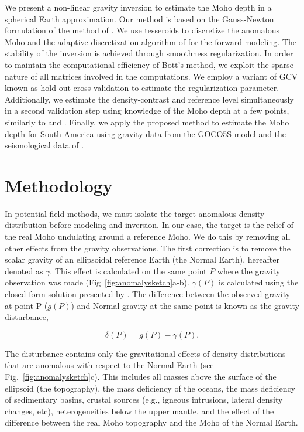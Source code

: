 \documentclass[extra,mreferee]{gji}
\begin{document}
We present a non-linear gravity inversion to estimate the Moho depth in
a spherical Earth approximation.
Our method is based on the \citet{silva2014} Gauss-Newton formulation of the
method of \citet{bott1960}.
We use tesseroids to discretize the anomalous Moho and the adaptive
discretization algorithm of \citet{uieda2016} for the forward modeling.
The stability of the inversion is achieved through smoothness regularization.
In order to maintain the computational efficiency of Bott's method,
we exploit the sparse nature of all matrices involved in the computations.
We employ a variant of GCV known as hold-out cross-validation \citep{kim2009}
to estimate the regularization parameter.
Additionally, we estimate the density-contrast and reference level
simultaneously in a second validation step using knowledge of the Moho depth at
a few points, similarly to \citet{silva2006} and \citet{martins2010}.
Finally, we apply the proposed method to estimate the Moho depth for South
America using gravity data from the GOCO5S model \citep{mayer-guerr2015} and
the seismological data of \citet{assumpcao2013a}.



\section{Methodology}

In potential field methods, we must isolate the target anomalous density
distribution before modeling and inversion.
In our case, the target is the relief of the real Moho undulating around a
reference Moho.
We do this by removing all other effects from the gravity observations.
The first correction is to remove the
scalar gravity of an ellipsoidal reference Earth (the Normal Earth),
hereafter denoted as $\gamma$.
This effect is calculated on the same point $P$ where
the gravity observation was made
(Fig~\ref{fig:anomalysketch}a-b).
$\gamma(P)$ is calculated using
the closed-form solution presented by \citet{li2001a}.
The difference between the observed gravity at point P ($g(P)$)
and Normal gravity at the same point
is known as the gravity disturbance,

\begin{equation}
    \delta(P) = g(P) - \gamma(P).
    \label{eq:disturbance}
\end{equation}

The disturbance contains only the gravitational effects of density
distributions that are anomalous with respect to the Normal Earth
(see Fig.~\ref{fig:anomalysketch}c).
This includes all masses above the surface of the ellipsoid (the topography),
the mass deficiency of the oceans,
the mass deficiency of sedimentary basins,
crustal sources (e.g., igneous intrusions, lateral density changes, etc),
heterogeneities below the upper mantle,
and the effect of the difference between the real Moho
topography and the Moho of the Normal Earth.
\end{document}
